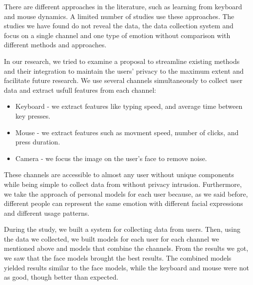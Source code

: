 There are different approaches in the literature, such as learning from keyboard and mouse dynamics. 
A limited number of studies use these approaches. The studies we have found do not reveal the data, 
the data collection system and focus on a single channel and one type of emotion without comparison with different methods and approaches.

In our research, we tried to examine a proposal to streamline existing methods and their integration to maintain the users' 
privacy to the maximum extent and facilitate future research. We use several channels simultaneously to collect user data and extract 
usfull features from each channel:

\begin{itemize}
    \item Keyboard - we extract features like typing speed, and average time between key presses.
    \item Mouse - we extract features such as movment speed, number of clicks, and press duration.
    \item Camera - we focus the image on the user’s face to remove noise.  
\end{itemize}

These channels are accessible to almost any user without unique components while being simple to collect data from without privacy intrusion. 
Furthermore, we take the approach of personal models for each user because, as we said before, different people can represent the same emotion 
with different facial expressions and different usage patterns.

During the study, we built a system for collecting data from users. 
Then, using the data we collected, we built models for each user for each channel we mentioned above and models that combine the channels. 
From the results we got, we saw that the face models brought the best results. The combined models yielded results similar to the face models,
while the keyboard and mouse were not as good, though better than expected.


